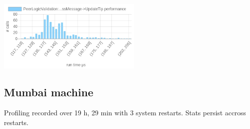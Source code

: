 \documentclass{article}
\begin{document}
\includegraphics[width=7cm]{images/london/chartPeerLogicValidation_3A_3AProcessMessages-_3EProcessMessage-_3EProcessMessage-_3EUpdateTip.png}




\subsection{Mumbai machine}



Profiling recorded over 19 h, 29 min with 3 system restarts. Stats persist accross restarts.
\end{document}

